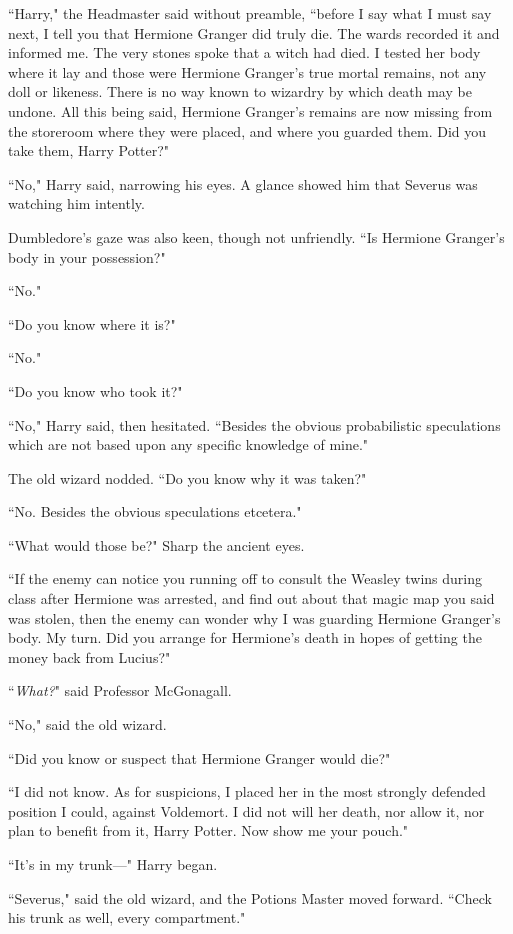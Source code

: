 ``Harry," the Headmaster said without preamble, ``before I say what I must say next, I tell you that Hermione Granger did truly die. The wards recorded it and informed me. The very stones spoke that a witch had died. I tested her body where it lay and those were Hermione Granger's true mortal remains, not any doll or likeness. There is no way known to wizardry by which death may be undone. All this being said, Hermione Granger's remains are now missing from the storeroom where they were placed, and where you guarded them. Did you take them, Harry Potter?"

``No," Harry said, narrowing his eyes. A glance showed him that Severus was watching him intently.

Dumbledore's gaze was also keen, though not unfriendly. ``Is Hermione Granger's body in your possession?"

``No."

``Do you know where it is?"

``No."

``Do you know who took it?"

``No," Harry said, then hesitated. ``Besides the obvious probabilistic speculations which are not based upon any specific knowledge of mine."

The old wizard nodded. ``Do you know why it was taken?"

``No. Besides the obvious speculations etcetera."

``What would those be?" Sharp the ancient eyes.

``If the enemy can notice you running off to consult the Weasley twins during class after Hermione was arrested, and find out about that magic map you said was stolen, then the enemy can wonder why I was guarding Hermione Granger's body. My turn. Did you arrange for Hermione's death in hopes of getting the money back from Lucius?"

``\emph{What?}" said Professor McGonagall.

``No," said the old wizard.

``Did you know or suspect that Hermione Granger would die?"

``I did not know. As for suspicions, I placed her in the most strongly defended position I could, against Voldemort. I did not will her death, nor allow it, nor plan to benefit from it, Harry Potter. Now show me your pouch."

``It's in my trunk---" Harry began.

``Severus," said the old wizard, and the Potions Master moved forward. ``Check his trunk as well, every compartment."

